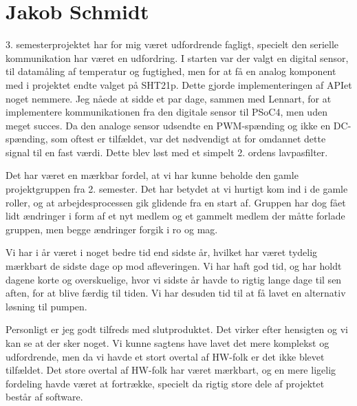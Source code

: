 \section{Jakob Schmidt}

3. semesterprojektet har for mig været udfordrende fagligt, specielt den serielle kommunikation har været en udfordring. I starten var der valgt en digital sensor, til datamåling af temperatur og fugtighed, men for at få en analog komponent med i projektet endte valget på SHT21p. Dette gjorde implementeringen af APIet noget nemmere. Jeg nåede at sidde et par dage, sammen med Lennart, for at implementere kommunikationen fra den digitale sensor til PSoC4, men uden meget succes. 
Da den analoge sensor udsendte en PWM-spænding og ikke en DC-spænding, som oftest er tilfældet, var det nødvendigt at for omdannet dette signal til en fast værdi. Dette blev løst med et simpelt 2. ordens lavpasfilter. 

\newpage

Det har været en mærkbar fordel, at vi har kunne beholde den gamle projektgruppen fra 2. semester. Det har betydet at vi hurtigt kom ind i de gamle roller, og at arbejdesprocessen gik glidende fra en start af. Gruppen har dog fået lidt ændringer i form af et nyt medlem og et gammelt medlem der måtte forlade gruppen, men begge ændringer forgik i ro og mag.

Vi har i år været i noget bedre tid end sidste år, hvilket har været tydelig mærkbart de sidste dage op mod afleveringen. Vi har haft god tid, og har holdt dagene korte og overskuelige, hvor vi sidste år havde to rigtig lange dage til sen aften, for at blive færdig til tiden. 
Vi har desuden tid til at få lavet en alternativ løsning til pumpen.

Personligt er jeg godt tilfreds med slutproduktet. Det virker efter hensigten og vi kan se at der sker noget. Vi kunne sagtens have lavet det mere komplekst og udfordrende, men da vi havde et stort overtal af HW-folk er det ikke blevet tilfældet. Det store overtal af HW-folk har været mærkbart, og en mere ligelig fordeling havde været at fortrække, specielt da rigtig store dele af projektet består af software. 

